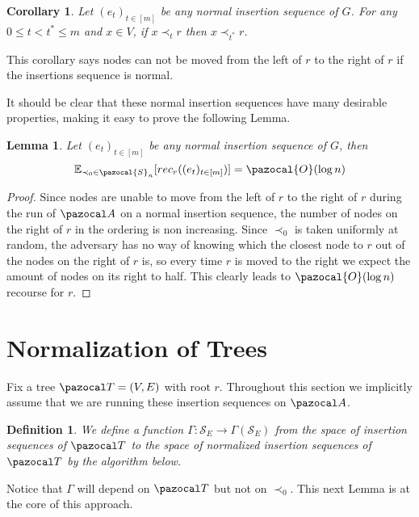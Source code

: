 \documentclass{article}
\newtheorem{lemma}{Lemma}
\newtheorem{corollary}{Corollary}
\newtheorem{definition}{Definition}
\begin{document}
\begin{corollary}
Let $(e_t)_{t \in [m]}$ be any normal insertion sequence of $G$. For any $0 \leq t < t^* \leq m$ and $x \in V$, if $x \prec_t r$ then $x \prec_{t^*} r$.
\end{corollary}

This corollary says nodes can not be moved from the left of $r$ to the right of $r$ if the insertions sequence is normal.

It should be clear that these normal insertion sequences have many desirable properties, making it easy to prove the following Lemma.

\begin{lemma}
Let $(e_t)_{t \in [m]}$ be any normal insertion sequence of $G$, then
\[ \mathbb{E}_{\prec_0 \in \pazocal{S}_n}[ rec_r((e_t)_{t \in [m]})] = \pazocal{O}(\log n) \]
\end{lemma}

\begin{proof}
Since nodes are unable to move from the left of $r$ to the right of $r$ during the run of $\pazocal A$ on a normal insertion sequence, the number of nodes on the right of $r$ in the ordering is non increasing. Since $\prec_0$ is taken uniformly at random, the adversary has no way of knowing which the closest node to $r$ out of the nodes on the right of $r$ is, so every time $r$ is moved to the right we expect the amount of nodes on its right to half. This clearly leads to $\pazocal{O}(\log n)$ recourse for $r$.
\end{proof}

\section{Normalization of Trees}

Fix a tree $\pazocal T=(V,E)$ with root $r$. Throughout this section we implicitly assume that we are running these insertion sequences on $\pazocal A$.

\begin{definition}
We define a function $\Gamma : \mathcal{S}_{E} \longrightarrow \Gamma(\mathcal{S}_{E})$ from the space of insertion sequences of $\pazocal T$ to the space of normalized insertion sequences of $\pazocal T$ by the algorithm below.
\end{definition}

Notice that $\Gamma$ will depend on $\pazocal T$ but not on $\prec_0$. This next Lemma is at the core of this approach.
\end{document}
